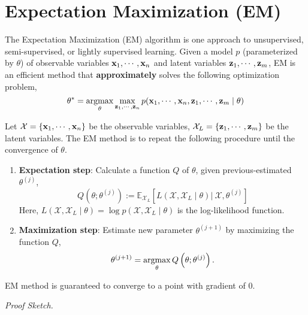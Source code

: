\section{Expectation Maximization (EM)}
The Expectation Maximization (EM) algorithm is one approach to unsupervised, semi-supervised, or lightly supervised learning. Given a model $p$ (parameterized by $\theta$) of observable variables $\mathbf{x}_1, \cdots, \mathbf{x}_n$ and latent variables $\mathbf{z}_1, \cdots, \mathbf{z}_m$, EM is an efficient method that \textbf{approximately} solves the following optimization problem,
\begin{equation}
	\theta^* = \operatorname*{argmax}_{\theta} \max_{\mathbf{z}_1, \cdots, \mathbf{z}_n} p(\mathbf{x}_1, \cdots, \mathbf{x}_n, \mathbf{z}_1, \cdots, \mathbf{z}_m \mid \theta)
\end{equation}

\begin{definition}[EM Principle]
	Let $\mathcal{X} = \{\mathbf{x}_1, \cdots, \mathbf{x}_n\}$ be the observable variables, $\mathcal{X}_L = \{\mathbf{z}_1, \cdots, \mathbf{z}_m\}$ be the latent variables. The EM method is to repeat the following procedure until the convergence of $\theta$. 
	\begin{enumerate}
		\item \textbf{Expectation step}: Calculate a function $Q$ of $\theta$, given  previous-estimated $\theta^{(j)}$,
		$$
Q\left({\theta}; {\theta}^{(j)}\right) := \mathbb{E}_{\mathcal{X}_{L}}\left[L\left(\mathcal{X}, \mathcal{X}_{L} \mid {\theta}\right) \lvert\  \mathcal{X}, {\theta}^{(j)}\right]
$$
Here, $L(\mathcal{X}, \mathcal{X}_{L} \mid {\theta}) = \log p(\mathcal{X}, \mathcal{X}_{L} \mid {\theta})$ is the log-likelihood function.
	\item \textbf{Maximization step}: Estimate new parameter ${\theta}^{(j + 1)}$ by maximizing the function $Q$,
	$$
	\theta^{(j + 1)} = \operatorname*{argmax}_\theta Q\left({\theta}; {\theta}^{(j)}\right).
	$$
	\end{enumerate}
\end{definition}
\begin{theorem}[EM's Correctness]
	 EM method is guaranteed to converge to a point with gradient of $0$.	
\end{theorem}
\textit{Proof Sketch.}

